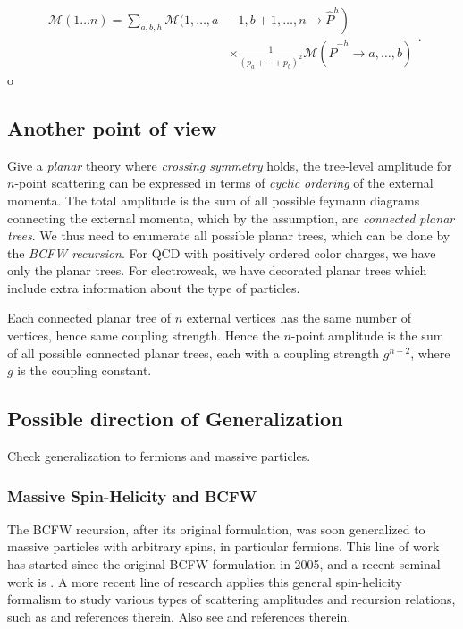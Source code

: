 \[
	\begin{aligned}
\mathcal{M}(1 \ldots n)=\sum_{a, b, h} \mathcal{M}(1, \ldots, a & \left.-1, b+1, \ldots, n \rightarrow \hat{P}^h\right) \\
& \times \frac{1}{\left(p_a+\cdots+p_b\right)^2} \mathcal{M}\left(\hat{P}^{-h} \rightarrow a, \ldots, b\right)
\end{aligned}
.\]o

\subsection{Another point of view}

Give a \textit{planar} theory where \textit{crossing symmetry} holds, the tree-level amplitude for $n$-point scattering can be expressed in terms of \textit{cyclic ordering} of the external momenta. The total amplitude is the sum of all possible feymann diagrams connecting the external momenta, which by the assumption, are \textit{connected planar trees}. We thus need to enumerate all possible planar trees, which can be done by the \textit{BCFW recursion}. For QCD with positively ordered color charges, we have only the planar trees. For electroweak, we have decorated planar trees which include extra information about the type of particles.

Each connected planar tree of $n$ external vertices has the same number of vertices, hence same coupling strength. Hence the $n$-point amplitude is the sum of all possible connected planar trees, each with a coupling strength $g^{n-2}$, where $g$ is the coupling constant. 



\subsection{Possible direction of Generalization}

Check generalization to fermions and massive particles.

\subsubsection{Massive Spin-Helicity and BCFW}

The BCFW recursion, after its original formulation, was soon generalized to massive particles with arbitrary spins, in particular fermions. This line of work has started since the original BCFW formulation in 2005, and a recent seminal work is \autocite{Arkani-Hamed:2017jhn}. 
A more recent line of research applies this general spin-helicity formalism to study various types of scattering amplitudes and recursion relations, such as \autocite{Abhishek:2022nqv} and references therein. Also see \autocite{Christensen:2024bdt, Ema:2024rss} and references therein.




